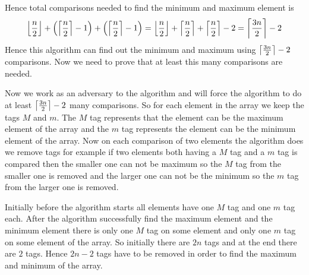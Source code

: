 \documentclass[a4paper, 11pt]{article}
\begin{document}
{Hence total comparisons needed to find the minimum and maximum element is $$\left\lfloor\frac{n}2\right\rfloor+ \left(\left\lceil\frac{n}2\right\rceil-1\right)+\left(\left\lceil\frac{n}2\right\rceil-1\right)=\left\lfloor\frac{n}2\right\rfloor+\left\lceil\frac{n}2\right\rceil+\left\lceil\frac{n}2\right\rceil-2= \left\lceil\frac{3n}2\right\rceil-2 $$Hence this algorithm can find out the minimum and maximum using $\left\lceil\frac{3n}2\right\rceil-2$ comparisons. Now we need to prove that at least this many comparisons are needed. 


Now we work as an adversary to the algorithm and will force the algorithm to do at least $\left\lceil \frac{3n}{2}\right\rceil-2$ many comparisons. So for each element in the array we keep the tags $M$ and $m$. The $M$ tag represents that the element can be the maximum element of the array and the $m$ tag represents the element can be the minimum element of the array. Now on each comparison of two elements the algorithm does we remove tags for example if two elements both having a $M$ tag and a $m$ tag is compared then the smaller one can not be  maximum so the $M$ tag from the smaller one is removed and the larger one can not be the minimum so the $m$ tag from the larger one is removed.

Initially before the algorithm starts all elements have one $M$ tag and one $m$ tag each. After the algorithm successfully find the maximum element and the minimum element there is only one $M$ tag on some element and only one $m$ tag on some element of the array. So initially there are $2n$ tags and at the end there are $2$ tags. Hence $2n-2$ tags have to be removed in order to find the maximum and minimum of the array. 

}
\end{document}
